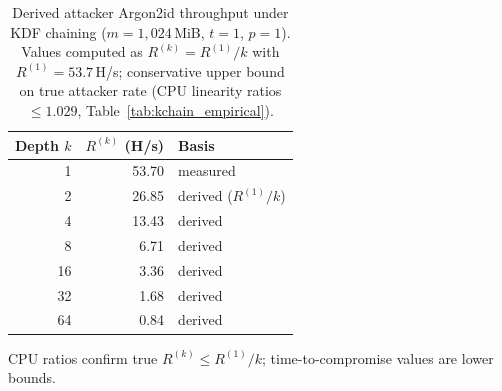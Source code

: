 \documentclass[journal,article,submit,pdftex,moreauthors]{Definitions/mdpi}
\newcommand{\add}[1]{#1}
\newcommand{\add}[1]{\added{#1}}
\begin{document}
\begin{table}[H]
\caption{\add{Derived attacker Argon2id throughput under KDF chaining ($m=1{,}024$\,MiB, $t=1$, $p=1$). Values computed as $R^{(k)} = R^{(1)}/k$ with $R^{(1)}=53.7$\,H/s; conservative upper bound on true attacker rate (CPU linearity ratios $\leq 1.029$, Table~\ref{tab:kchain_empirical}).}}
\label{tab:argon2_kchain_attacker}
\centering
\begin{minipage}{0.5\linewidth}
\centering
\begin{tabular}{rrl}
\toprule
\textbf{Depth $k$} & \textbf{$R^{(k)}$ (H/s)} & \textbf{Basis} \\
\midrule
 1 & 53.70 & measured \\
 2 & 26.85 & derived ($R^{(1)}/k$) \\
 4 & 13.43 & derived \\
 8 &  6.71 & derived \\
16 &  3.36 & derived \\
32 &  1.68 & derived \\
64 &  0.84 & derived \\
\bottomrule
\end{tabular}
\par\smallskip
{\footnotesize CPU ratios confirm true $R^{(k)} \leq R^{(1)}/k$; time-to-compromise values are lower bounds.}
\end{minipage}
\end{table}
\end{document}
